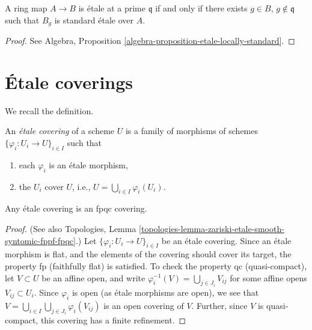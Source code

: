 \begin{theorem}
\label{theorem-standard-etale}
A ring map $A \to B$ is \'etale at a prime $\mathfrak q$ if and only if there
exists $g \in B$, $g \not \in \mathfrak q$ such that $B_g$ is standard
\'etale over $A$.
\end{theorem}

\begin{proof}
See
Algebra, Proposition \ref{algebra-proposition-etale-locally-standard}.
\end{proof}





\section{\'Etale coverings}
\label{section-etale-covering}

\noindent
We recall the definition.

\begin{definition}
\label{definition-etale-covering}
An {\it \'etale covering} of a scheme $U$ is a family of morphisms
of schemes
$\{\varphi_i : U_i \to U\}_{i \in I}$ such that
\begin{enumerate}
\item each $\varphi_i$ is an \'etale morphism,
\item the $U_i$ cover $U$, i.e., $U = \bigcup_{i\in I}\varphi_i(U_i)$.
\end{enumerate}
\end{definition}

\begin{lemma}
\label{lemma-etale-fpqc}
Any \'etale covering is an fpqc covering.
\end{lemma}

\begin{proof}
(See also
Topologies,
Lemma \ref{topologies-lemma-zariski-etale-smooth-syntomic-fppf-fpqc}.)
Let $\{\varphi_i : U_i \to U\}_{i \in I}$ be an \'etale covering.
Since an \'etale morphism is flat, and the elements of the covering should
cover its target, the property fp (faithfully flat) is satisfied.
To check the property qc (quasi-compact), let $V \subset U$ be an affine
open, and write $\varphi_i^{-1}(V) = \bigcup_{j \in J_i} V_{ij}$
for some affine opens $V_{ij} \subset U_i$. Since $\varphi_i$ is open
(as \'etale morphisms are open), we see that
$V = \bigcup_{i\in I} \bigcup_{j \in J_i} \varphi_i(V_{ij})$
is an open covering of $V$.
Further, since $V$ is quasi-compact, this covering has a finite
refinement.
\end{proof}

